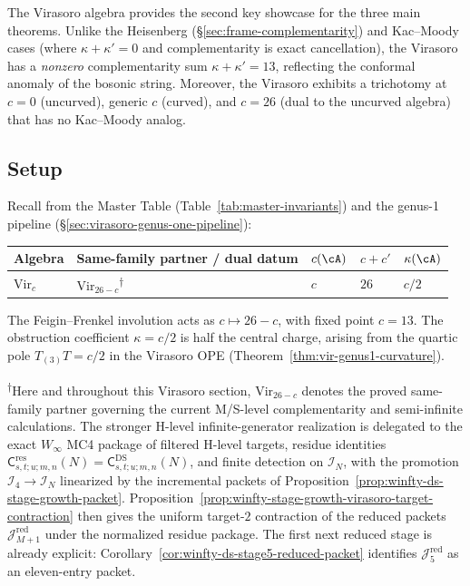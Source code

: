 The Virasoro algebra provides the second key showcase for the three main theorems.  Unlike the Heisenberg (\S\ref{sec:frame-complementarity}) and Kac--Moody cases (where $\kappa + \kappa' = 0$ and complementarity is exact cancellation), the Virasoro has a \emph{nonzero} complementarity sum $\kappa + \kappa' = 13$, reflecting the conformal anomaly of the bosonic string.  Moreover, the Virasoro exhibits a trichotomy at $c = 0$ (uncurved), generic $c$ (curved), and $c = 26$ (dual to the uncurved algebra) that has no Kac--Moody analog.

\subsection{Setup}\label{subsec:vir-genus-setup}

Recall from the Master Table (Table~\ref{tab:master-invariants}) and the genus-1 pipeline (\S\ref{sec:virasoro-genus-one-pipeline}):

\begin{center}
\renewcommand{\arraystretch}{1.4}
\begin{tabular}{lllll}
\toprule
Algebra & Same-family partner / dual datum & $c(\cA)$ & $c + c'$ & $\kappa(\cA)$ \\
\midrule
$\mathrm{Vir}_c$ & $\mathrm{Vir}_{26-c}$\textsuperscript{$\dagger$} & $c$ & $26$ & $c/2$ \\[4pt]
\bottomrule
\end{tabular}
\end{center}
The Feigin--Frenkel involution acts as $c \mapsto 26 - c$, with fixed
point $c = 13$.  The obstruction coefficient $\kappa = c/2$ is half
the central charge, arising from the quartic pole $T_{(3)}T = c/2$ in
the Virasoro OPE (Theorem~\ref{thm:vir-genus1-curvature}).

\textsuperscript{$\dagger$}Here and throughout this Virasoro section,
$\mathrm{Vir}_{26-c}$ denotes the proved same-family partner governing
the current M/S-level complementarity and semi-infinite calculations.
The stronger H-level infinite-generator realization is delegated to the
exact $W_\infty$ MC4 package of filtered H-level targets, residue
identities
$\mathsf{C}^{\mathrm{res}}_{s,t;u;m,n}(N)
=\mathsf{C}^{\mathrm{DS}}_{s,t;u;m,n}(N)$,
and finite detection on $\mathcal{I}_N$, with the promotion
$\mathcal{I}_4\to\mathcal{I}_N$ linearized by the incremental packets
of Proposition~\ref{prop:winfty-ds-stage-growth-packet}.
Proposition~\ref{prop:winfty-stage-growth-virasoro-target-contraction}
then gives the uniform target-$2$ contraction of the reduced packets
$\mathcal{J}_{M+1}^{\mathrm{red}}$ under the normalized residue
package.  The first next reduced stage is already explicit:
Corollary~\ref{cor:winfty-ds-stage5-reduced-packet} identifies
$\mathcal{J}_5^{\mathrm{red}}$ as an eleven-entry packet.

